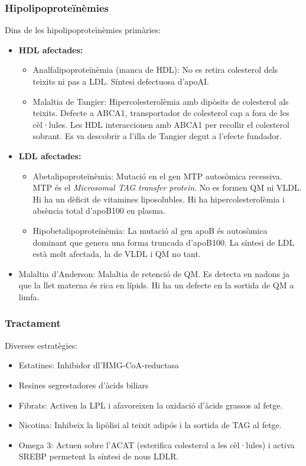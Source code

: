 \subsubsection{Hipolipoproteïnèmies}
\label{sec:hipolipoproteinemies}
Dins de les hipolipoproteïnèmies primàries:
\begin{itemize}
\item \textbf{HDL afectades:}
  \begin{itemize}
  \item Analfalipoproteïnèmia (manca de HDL): No es retira colesterol
    dels teixits ni pas a LDL. Síntesi defectuosa d'apoAI.
 
  \item Malaltia de Tangier: Hipercolesterolèmia amb dipòsits de
    colesterol als teixits. Defecte a ABCA1, transportador de
    colesterol cap a fora de les cèl·lules. Les HDL interaccionen amb
    ABCA1 per recollir el colesterol sobrant. Es va descobrir a l'illa
    de Tangier degut a l'efecte fundador.
  \end{itemize}

\item \textbf{LDL afectades:}
  \begin{itemize}
  \item Abetalipoproteïnèmia: Mutació en el gen MTP autosòmica
    recessiva. MTP és el \textit{Microsomal TAG transfer protein}. No
    es formen QM ni VLDL. Hi ha un dèficit de vitamines
    liposolubles. Hi ha hipercolesterolèmia i absència total d'apoB100
    en plasma.

  \item Hipobetalipoproteïnèmia: La mutació al gen apoB és autosòmica
    dominant que genera una forma truncada d'apoB100. La síntesi de
    LDL està molt afectada, la de VLDL i QM no tant.
  \end{itemize}

\item Malaltia d'Anderson: Malaltia de retenció de QM. Es detecta en
  nadons ja que la llet materna és rica en lípids. Hi ha un defecte en
  la sortida de QM a limfa.
\end{itemize}

\subsubsection{Tractament}
\label{sec:tractament}

Diverses estratègies:
\begin{itemize}
\item Estatines: Inhibidor dl'HMG-CoA-reductasa
\item Resines segrestadores d'àcids biliars
\item Fibrats: Activen la LPL i afavoreixen la oxidació d'àcids
  grassos al fetge.
\item Nicotina: Inhibeix la lipòlisi al teixit adipós i la sortida de
  TAG al fetge.
\item Omega 3: Actuen sobre l'ACAT (esterifica colesterol a les
  cèl·lules) i activa SREBP permetent la síntesi de nous LDLR.
\end{itemize}